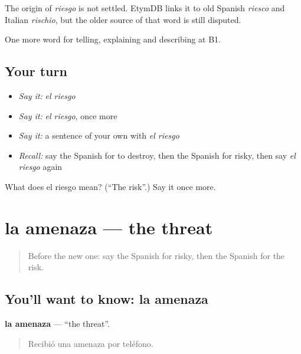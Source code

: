 \begin{cousinweb}
The origin of \emph{riesgo} is not settled. EtymDB links it to old Spanish \emph{riesco} and Italian \emph{rischio}, but the older source of that word is still disputed.
\end{cousinweb}

\begin{grammarlens}[title={What you've built}]
One more word for telling, explaining and describing at B1.
\end{grammarlens}

\subsection*{Your turn}
\begin{itemize}
\raggedright
  \item \emph{Say it:} \emph{el riesgo}
  \item \emph{Say it:} \emph{el riesgo}, once more
  \item \emph{Say it:} a sentence of your own with \emph{el riesgo}
  \item \emph{Recall:} say the Spanish for to destroy, then the Spanish for risky, then say \emph{el riesgo} again
\end{itemize}

\begin{tcolorbox}[breakable,colback=teal!4,colframe=teal!35!black,title={Before you move on}]
What does el riesgo mean? (\textquotedblleft{}The risk\textquotedblright{}.) Say it once more.
\end{tcolorbox}
\section[la amenaza]{la amenaza — the threat}

\label{lesson:ES-C530-amenaza}



\begin{quote}
Before the new one: say the Spanish for risky, then the Spanish for the risk.
\end{quote}

\subsection*{You'll want to know: la amenaza}
\textbf{la amenaza} — \textquotedblleft{}the threat\textquotedblright{}.

\begin{quote}
Recibió una amenaza por teléfono.
\end{quote}

